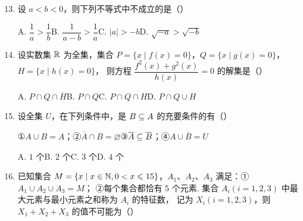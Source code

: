 \documentclass[a4paper,11pt]{article}
\begin{document}

\begin{enumerate}
\setcounter{enumi}{12}

\item 设 $a<b<0$，则下列不等式中不成立的是\mbox{（\quad）}

\keepwithprev
A. $\dfrac1a>\dfrac1b$\qquad B. $\dfrac{1}{a-b}>\dfrac1a$\qquad C. $|a|>-b$\qquad D. $\sqrt{-a}>\sqrt{-b}$


\ifanswer
\solbegin
{}
\solend

\fi

\item 设实数集 $\mathbb{R}$ 为全集，集合 $P=\{x\mid f(x)=0\}$，$Q=\{x\mid g(x)=0\}$，$H=\{x\mid h(x)=0\}$，
则方程 $\dfrac{f^2(x)+g^2(x)}{h(x)}=0$ 的解集是\mbox{（\quad）}

\keepwithprev
A. $P\cap Q\cap\overline{H}$\qquad B. $P\cap Q$\qquad C. $P\cap Q\cap H$\qquad D. $P\cap Q\cup H$


\ifanswer
\solbegin
{}
\solend

\fi

\item 设全集 $U$，在下列条件中，是 $B\subseteq A$ 的充要条件的有\mbox{（\quad）}

\keepwithprev
①$A\cup B=A$；\qquad ②$\overline{A}\cap B=\varnothing$\qquad ③$\overline{A}\subseteq\overline{B}$；\qquad ④$A\cup\overline{B}=U$

\keepwithprev
A. $1$ 个\qquad B. $2$ 个\qquad C. $3$ 个\qquad D. $4$ 个


\item 已知集合 $M=\{x\mid x\in\mathbb{N},0<x\leqslant15\}$，$A_1$、$A_2$、$A_3$ 满足：①$A_1\cup A_2\cup A_3=M$；
②每个集合都恰有 $5$ 个元素. 集合 $A_i(i=1,2,3)$ 中最大元素与最小元素之和称为 $A_i$ 的特征数，
记为 $X_i(i=1,2,3)$，则 $X_1+X_2+X_3$ 的值不可能为\mbox{（\quad）}


\end{enumerate}
\end{document}

